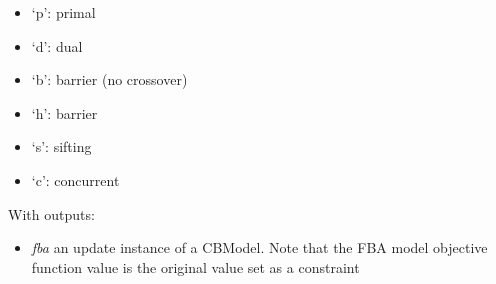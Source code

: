 \documentclass[a4paper,11pt,english]{sphinxmanual}
\begin{document}
\begin{fulllineitems}
\begin{itemize}
\begin{itemize}
\item {} 
`p': primal

\item {} 
`d': dual

\item {} 
`b': barrier (no crossover)

\item {} 
`h': barrier

\item {} 
`s': sifting

\item {} 
`c': concurrent

\end{itemize}

\end{itemize}

With outputs:
\begin{itemize}
\item {} 
\emph{fba} an update instance of a CBModel. Note that the FBA model objective function value is the original value set as a constraint

\end{itemize}

\end{fulllineitems}

\end{document}
